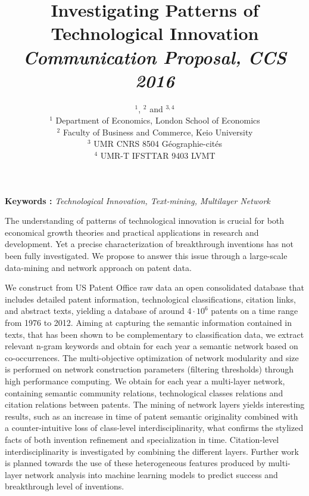 


\title{Investigating Patterns of Technological Innovation\\\bigskip
\textit{Communication Proposal, CCS 2016}
}
\author{$^{1}$, $^2$ and $^{3,4}$\\
$^1$ Department of Economics, London School of Economics\\
$^2$ Faculty of Business and Commerce, Keio University\\
$^3$ UMR CNRS 8504 Géographie-cités\\
$^4$ UMR-T IFSTTAR 9403 LVMT
}
\date{}

\maketitle

\justify


\textbf{Keywords : }\textit{Technological Innovation, Text-mining, Multilayer Network}

\bigskip

The understanding of patterns of technological innovation is crucial for both economical growth theories and practical applications in research and development. Yet a precise characterization of breakthrough inventions has not been fully investigated. We propose to answer this issue through a large-scale data-mining and network approach on patent data.

We construct from US Patent Office raw data an open consolidated database that includes detailed patent information, technological classifications, citation links, and abstract texts, yielding a database of around $4\cdot 10^6$ patents on a time range from 1976 to 2012. Aiming at capturing the semantic information contained in texts, that has been shown to be complementary to classification data, we extract relevant n-gram keywords and obtain for each year a semantic network based on co-occurrences. The multi-objective optimization of network modularity and size is performed on network construction parameters (filtering thresholds) through high performance computing. We obtain for each year a multi-layer network, containing semantic community relations, technological classes relations and citation relations between patents. The mining of network layers yields interesting results, such as an increase in time of patent semantic originality combined with a counter-intuitive loss of class-level interdisciplinarity, what confirms the stylized facts of both invention refinement and specialization in time. Citation-level interdisciplinarity is investigated by combining the different layers. Further work is planned towards the use of these heterogeneous features produced by multi-layer network analysis into machine learning models to predict success and breakthrough level of inventions.

